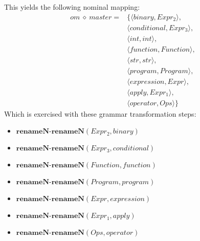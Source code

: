 This yields the following nominal mapping:
\begin{align*}\mathit{om} \:\diamond\: \mathit{master} =& \{\langle \mathit{binary},\mathit{Expr_2}\rangle,\\
 & \langle \mathit{conditional},\mathit{Expr_3}\rangle,\\
 & \langle int,int\rangle,\\
 & \langle \mathit{function},\mathit{Function}\rangle,\\
 & \langle str,str\rangle,\\
 & \langle \mathit{program},\mathit{Program}\rangle,\\
 & \langle \mathit{expression},\mathit{Expr}\rangle,\\
 & \langle \mathit{apply},\mathit{Expr_1}\rangle,\\
 & \langle \mathit{operator},\mathit{Ops}\rangle\}\end{align*}
 Which is exercised with these grammar transformation steps:

{\footnotesize\begin{itemize}
\item $\mathbf{renameN\text{-}renameN}\left(\mathit{Expr_2},\mathit{binary}\right)$
\item $\mathbf{renameN\text{-}renameN}\left(\mathit{Expr_3},\mathit{conditional}\right)$
\item $\mathbf{renameN\text{-}renameN}\left(\mathit{Function},\mathit{function}\right)$
\item $\mathbf{renameN\text{-}renameN}\left(\mathit{Program},\mathit{program}\right)$
\item $\mathbf{renameN\text{-}renameN}\left(\mathit{Expr},\mathit{expression}\right)$
\item $\mathbf{renameN\text{-}renameN}\left(\mathit{Expr_1},\mathit{apply}\right)$
\item $\mathbf{renameN\text{-}renameN}\left(\mathit{Ops},\mathit{operator}\right)$
\end{itemize}}

